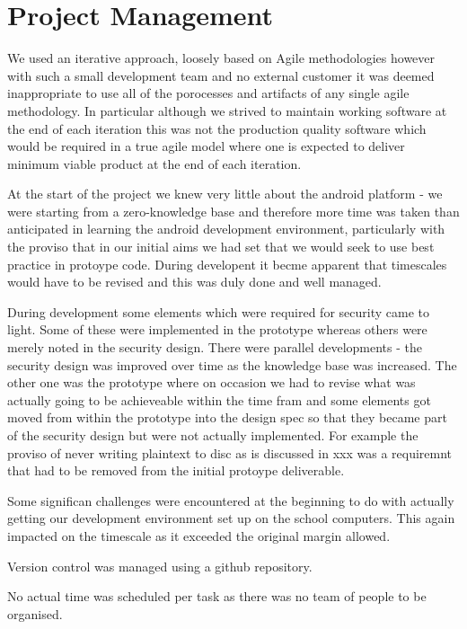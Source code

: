 
\chapter{Project Management}
\label{cha:mgt}
We used an iterative approach, loosely based on Agile methodologies however with such a small development team and no external customer it was deemed inappropriate to use all of the porocesses and artifacts of any single agile methodology.  In particular although we strived to maintain working software at the end of each iteration this was not the production quality software which would be required in a true agile model where one is expected to deliver minimum viable product at the end of each iteration.

At the start of the project we knew very little about the android platform - we were starting from a zero-knowledge base and therefore more time was taken than anticipated in learning the android development environment, particularly with the proviso that in our initial aims we had set that we would seek to use best practice in protoype code.  During developent it becme apparent that timescales would have to be revised and this was duly done and well managed.

During development some elements which were required for security came to light.  Some of these were implemented in the prototype whereas others were merely noted in the security design.  There were parallel developments - the security design was improved over time as the knowledge base was increased. The other one was the prototype where on occasion we had to revise what was actually going to be achieveable within the time fram and some elements got moved from within the prototype into the design spec so that they became part of the security design but were not actually implemented.  For example the proviso of never writing plaintext to disc as is discussed in xxx was a requiremnt that had to be removed from the initial protoype deliverable.

Some significan challenges were encountered at the beginning to do with actually getting our development environment set up on the school computers.  This again impacted on the timescale as it exceeded the original margin allowed.




Version control was managed using a github repository.

No actual time was scheduled per task as there was no team of people to be organised.

